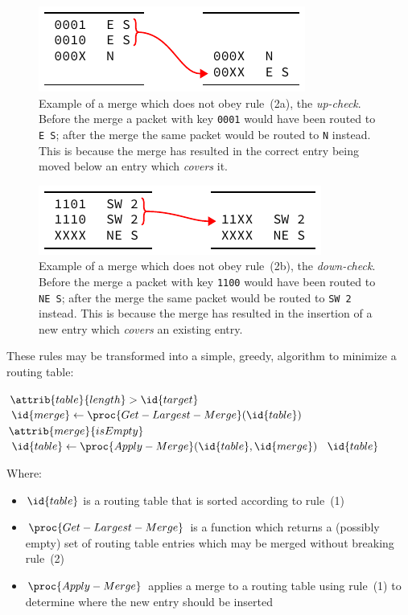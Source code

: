 \documentclass[conference]{IEEEtran}
\newcommand{\mytt}[1]{\texttt{\footnotesize#1}}
\begin{document}
  \begin{figure}
    \centering
    \includegraphics{figures/rule2a_example}
    \caption{
      Example of a merge which does not obey rule~(2a), the \textit{up-check}.
      Before the merge a packet with key \mytt{0001} would have been routed to \mytt{E~S}; after the merge the same packet would be routed to \mytt{N} instead.
      This is because the merge has resulted in the correct entry being moved below an entry which \textit{covers} it.
    }
    \label{fig:algorithm/rule2a_example}
  \end{figure}

  \begin{figure}
    \centering
    \includegraphics{figures/rule2b_example}
    \caption{
      Example of a merge which does not obey rule~(2b), the \textit{down-check}.
      Before the merge a packet with key \mytt{1100} would have been routed to \mytt{NE~S}; after the merge the same packet would be routed to \mytt{SW 2} instead.
      This is because the merge has resulted in the insertion of a new entry which \textit{covers} an existing entry.
    }
    \label{fig:algorithm/rule2b_example}
  \end{figure}

  These rules may be transformed into a simple, greedy, algorithm to minimize a routing table:

  \begin{codebox}
    \li \While $\attrib{table}{length} >  \id{target}$
    \li \Do $\id{merge} \gets \proc{Get-Largest-Merge}(\id{table})$
    \li     \If $\attrib{merge}{isEmpty}$
    \li     \Then {} \End
    \li     $\id{table} \gets \proc{Apply-Merge}(\id{table}, \id{merge})$
        \End
    \li \Return $\id{table}$
  \end{codebox}

  \noindent Where:
  \begin{itemize}
    \item $\id{table}$ is a routing table that is sorted according to rule~(1)
    \item $\proc{Get-Largest-Merge}$ is a function which returns a (possibly empty) set of routing table entries which may be merged without breaking rule~(2)
    \item $\proc{Apply-Merge}$ applies a merge to a routing table using rule~(1) to determine where the new entry should be inserted
  \end{itemize}
\end{document}
